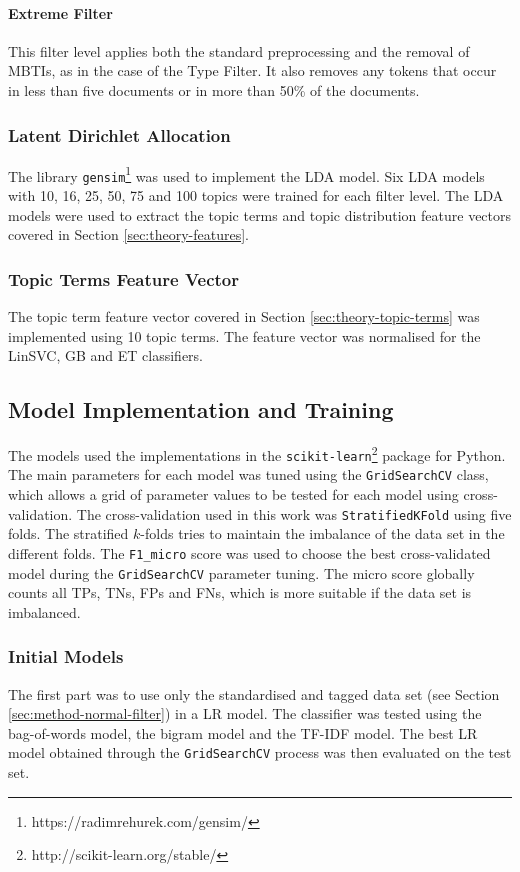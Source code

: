 \paragraph{Extreme Filter} \label{sec:method-extreme-filter}
This filter level applies both the standard preprocessing and the removal of MBTIs, as in the case of the Type Filter.
It also removes any tokens that occur in less than five documents or in more than 50\% of the documents.

\subsubsection{Latent Dirichlet Allocation}
The library \texttt{gensim}\footnote{https://radimrehurek.com/gensim/} was used to implement the LDA model.
Six LDA models with 10, 16, 25, 50, 75 and 100 topics were trained for each filter level.
The LDA models were used to extract the topic terms and topic distribution feature vectors covered in Section \ref{sec:theory-features}.


\subsubsection{Topic Terms Feature Vector}
The topic term feature vector covered in Section \ref{sec:theory-topic-terms} was implemented using 10 topic terms.
The feature vector was normalised for the LinSVC, GB and ET classifiers.


\subsection{Model Implementation and Training}
The models used the implementations in the \texttt{scikit-learn}\footnote{http://scikit-learn.org/stable/} package for Python.
The main parameters for each model was tuned using the \texttt{GridSearchCV} class, which allows a grid of parameter values to be tested for each model using cross-validation. 
The cross-validation used in this work was \texttt{StratifiedKFold} using five folds.
The stratified $k$-folds tries to maintain the imbalance of the data set in the different folds. 
The \texttt{F1\_micro} score was used to choose the best cross-validated model during the \texttt{GridSearchCV} parameter tuning.
The micro score globally counts all TPs, TNs, FPs and FNs, which is more suitable if the data set is imbalanced. 

\subsubsection{Initial Models} \label{sec:method-initial-models}
The first part was to use only the standardised and tagged data set (see Section \ref{sec:method-normal-filter}) in a LR model.
The classifier was tested using the bag-of-words model, the bigram model and the TF-IDF model.
The best LR model obtained through the \texttt{GridSearchCV} process was then evaluated on the test set.


